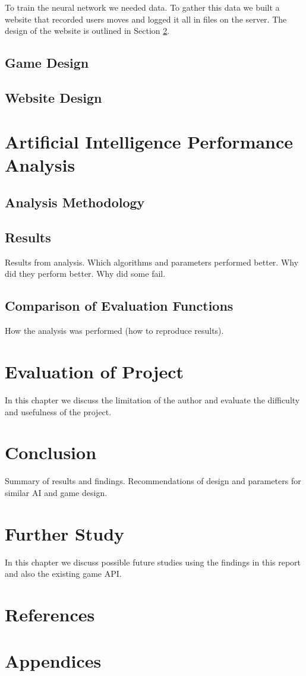 \documentclass{bhamthesis}
\theoremstyle{definition}
\begin{document}
To train the neural network we needed data. To gather this data we built a website that recorded users moves and logged it all in files on the server. The design of the website is outlined in Section \ref{s:website}.


\section{Game Design}\label{s:gamed}

\section{Website Design}\label{s:website}


\chapter{Artificial Intelligence Performance Analysis}
\section{Analysis Methodology}
\section{Results}
Results from analysis. \cite{Browne2012}
Which algorithms and parameters performed better.
Why did they perform better.
Why did some fail.
\section{Comparison of Evaluation Functions}
How the analysis was performed (how to reproduce results).


\chapter{Evaluation of Project}
In this chapter we discuss the limitation of the author and evaluate the difficulty and usefulness of the project.

\chapter{Conclusion}
Summary of results and findings. Recommendations of design and parameters for similar AI and game design.

\chapter{Further Study}
In this chapter we discuss possible future studies using the findings in this report and also the existing game API.



\backmatter
\chapter{References}
\printbibliography[heading=none]
%
%

\chapter{Appendices}
\end{document}
